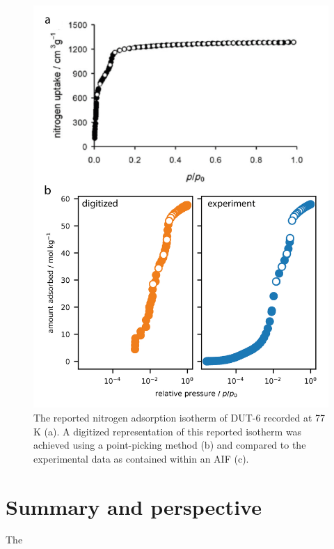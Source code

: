 \documentclass[journal=langd5,manuscript=article]{achemso}
\begin{document}
  
  \begin{figure}[htb]
    \includegraphics{./figures/example-01.png}
      \caption{The reported nitrogen adsorption isotherm of DUT-6 recorded at 77$\,$K (a). A digitized representation of this reported isotherm was achieved using a point-picking method (b) and compared to the experimental data as contained within an AIF (c).}
      \label{fgr:example}
    \end{figure}


\section{Summary and perspective}
The 


\end{document}
